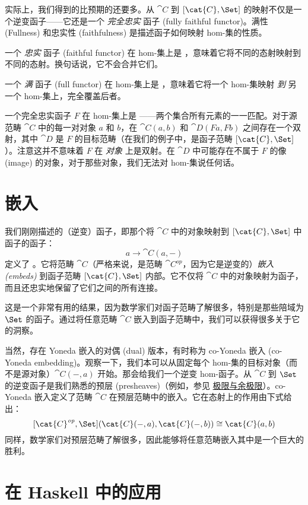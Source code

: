 \noindent
实际上，我们得到的比预期的还要多。从 $\cat{C}$ 到 $[\cat{C}, \Set]$ 的映射不仅是一个逆变函子——它还是一个 \emph{完全忠实} 函子 (fully faithful functor)。满性 (Fullness) 和忠实性 (faithfulness) 是描述函子如何映射 hom-集的性质。

一个 \emph{忠实} 函子 (faithful functor) 在 hom-集上是 ，意味着它将不同的态射映射到不同的态射。换句话说，它不会合并它们。

一个 \emph{满} 函子 (full functor) 在 hom-集上是 ，意味着它将一个 hom-集映射 \emph{到} 另一个 hom-集上，完全覆盖后者。

一个完全忠实函子 $F$ 在 hom-集上是 ——两个集合所有元素的一一匹配。对于源范畴 $\cat{C}$ 中的每一对对象 $a$ 和 $b$，在 $\cat{C}(a, b)$ 和 $\cat{D}(F a, F b)$ 之间存在一个双射，其中 $\cat{D}$ 是 $F$ 的目标范畴（在我们的例子中，是函子范畴 $[\cat{C}, \Set]$）。注意这并不意味着 $F$ 在 \emph{对象} 上是双射。在 $\cat{D}$ 中可能存在不属于 $F$ 的像 (image) 的对象，对于那些对象，我们无法对 hom-集说任何话。

\section{嵌入}

我们刚刚描述的（逆变）函子，即那个将 $\cat{C}$ 中的对象映射到 $[\cat{C}, \Set]$ 中函子的函子：
\[a \to \cat{C}(a, -)\]
定义了 。它将范畴 $\cat{C}$（严格来说，是范畴 $\cat{C}^\mathit{op}$，因为它是逆变的）\emph{嵌入 (embeds)} 到函子范畴 $[\cat{C}, \Set]$ 内部。它不仅将 $\cat{C}$ 中的对象映射为函子，而且还忠实地保留了它们之间的所有连接。

这是一个非常有用的结果，因为数学家们对函子范畴了解很多，特别是那些陪域为 $\Set$ 的函子。通过将任意范畴 $\cat{C}$ 嵌入到函子范畴中，我们可以获得很多关于它的洞察。

当然，存在 Yoneda 嵌入的对偶 (dual) 版本，有时称为 co-Yoneda 嵌入 (co-Yoneda embedding)。观察一下，我们本可以从固定每个 hom-集的目标对象（而不是源对象）$\cat{C}(-, a)$ 开始。那会给我们一个逆变 hom-函子。从 $\cat{C}$ 到 $\Set$ 的逆变函子是我们熟悉的预层 (presheaves)（例如，参见 \hyperref[limits-and-colimits]{极限与余极限}）。co-Yoneda 嵌入定义了范畴 $\cat{C}$ 在预层范畴中的嵌入。它在态射上的作用由下式给出：
\[[\cat{C}^\mathit{op}, \Set](\cat{C}(-, a), \cat{C}(-, b)) \cong \cat{C}(a, b)\]
同样，数学家们对预层范畴了解很多，因此能够将任意范畴嵌入其中是一个巨大的胜利。

\section{在 Haskell 中的应用}

